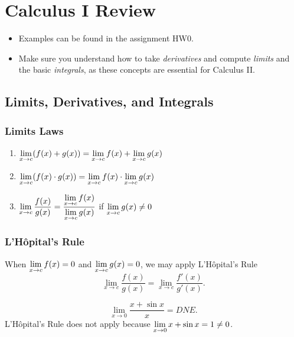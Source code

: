 \section{Calculus I Review}
\begin{center}
\begin{tcolorbox}
    \begin{itemize}
        \item Examples can be found in the assignment HW0. 
    
        \item Make sure you understand how to take \textit{derivatives} and compute \textit{limits} and the basic \textit{integrals}, as these concepts are essential for Calculus II.
    \end{itemize}
\end{tcolorbox}
\end{center}


\subsection{Limits, Derivatives, and Integrals}

\subsubsection{Limits Laws}
\begin{enumerate}
    \item $\displaystyle\lim_{x \to c} (f(x) + g(x)) = \displaystyle\lim_{x \to c} f(x) + \displaystyle\lim_{x \to c} g(x)$
    \item $\displaystyle\lim_{x \to c} (f(x) \cdot g(x)) = \displaystyle\lim_{x \to c} f(x) \cdot \displaystyle\lim_{x \to c} g(x)$
    \item $\displaystyle\lim_{x \to c} \frac{f(x)}{g(x)} = \frac{\displaystyle\lim_{x \to c} f(x)}{\displaystyle\lim_{x \to c} g(x)}$ if $\displaystyle\lim_{x \to c} g(x) \neq 0$
\end{enumerate}


\subsubsection{L'H\^{o}pital's Rule}
When $\displaystyle\lim_{x \to c} f(x) = 0$ and $\displaystyle\lim_{x \to c} g(x) = 0$, we may apply L'H\^{o}pital's Rule
\[\lim_{x \to c} \frac{f(x)}{g(x)} = \lim_{x \to c} \frac{f'(x)}{g'(x)}.\]

\begin{ex}
    \[\lim_{x \to 0} \frac{x + \sin x}{x} = DNE.\]
L'H\^{o}pital's Rule does not apply because $\displaystyle\lim_{x \to 0} x + \sin x = 1 \neq 0$.
\end{ex}


